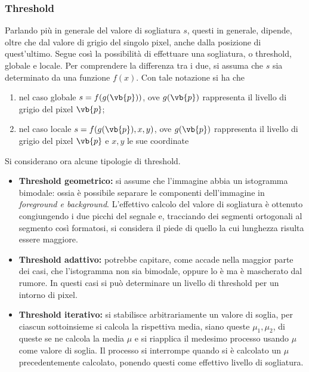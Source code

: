 \documentclass{subfiles}
\begin{document}
\subsubsection{Threshold}
Parlando più in generale del valore di sogliatura \(s\), questi in generale, dipende, oltre che dal valore di grigio del singolo pixel, anche dalla posizione di quest'ultimo.
Segue così la possibilità di effettuare una sogliatura, o threshold, globale e locale.
Per comprendere la differenza tra i due, si assuma che \(s\) sia determinato da una funzione \(f(x)\).
Con tale notazione si ha che
\begin{enumerate}
    \item nel caso globale \(s = f(g(\vb{p}))\), ove \(g(\vb{p})\) rappresenta il livello di grigio del pixel \(\vb{p}\);
    \item nel caso locale \(s = f(g(\vb{p}), x, y)\), ove \(g(\vb{p})\) rappresenta il livello di grigio del pixel \(\vb{p}\) e \(x, y\) le sue coordinate
\end{enumerate}

Si considerano ora alcune tipologie di threshold.
\begin{itemize}
    \item \textbf{Threshold geometrico:} si assume che l'immagine abbia un istogramma bimodale:
          ossia è possibile separare le componenti dell'immagine in \emph{foreground \emph{e} background}.
          L'effettivo calcolo del valore di sogliatura è ottenuto congiungendo i due picchi del segnale e, tracciando dei segmenti ortogonali al segmento così formatosi,
          si considera il piede di quello la cui lunghezza risulta essere maggiore.

    \item \textbf{Threshold adattivo:} potrebbe capitare, come accade nella maggior parte dei casi, che l'istogramma non sia bimodale,
          oppure lo è ma è mascherato dal rumore. In questi casi si può determinare un livello di threshold per un intorno di pixel.

    \item \textbf{Threshold iterativo:} si stabilisce arbitrariamente un valore di soglia, per ciascun sottoinsieme si calcola la rispettiva media,
          siano queste \(\mu_{1}, \mu_{2}\), di queste se ne calcola la media \(\mu\) e si riapplica il medesimo processo usando \(\mu\) come valore di soglia.
          Il processo si interrompe quando si è calcolato un \(\mu\) precedentemente calcolato, ponendo questi come effettivo livello di sogliatura.
\end{itemize}
\end{document}
